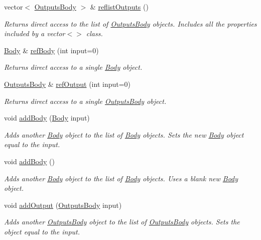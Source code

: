 \begin{DoxyCompactItemize}
vector$<$ \hyperlink{class_outputs_body}{Outputs\-Body} $>$ \& \hyperlink{class_system_aea22bb014c1b994c336842076cc86483}{reflist\-Outputs} ()
\begin{DoxyCompactList}\small\item\em Returns direct access to the list of \hyperlink{class_outputs_body}{Outputs\-Body} objects. Includes all the properties included by a vector$<$$>$ class. \end{DoxyCompactList}\item 
\hyperlink{class_body}{Body} \& \hyperlink{class_system_a3bb2a6aaa71a7b4b58afc8d92a67e214}{ref\-Body} (int input=0)
\begin{DoxyCompactList}\small\item\em Returns direct access to a single \hyperlink{class_body}{Body} object. \end{DoxyCompactList}\item 
\hyperlink{class_outputs_body}{Outputs\-Body} \& \hyperlink{class_system_af5cdbac74348f475cc5a529134ac418d}{ref\-Output} (int input=0)
\begin{DoxyCompactList}\small\item\em Returns direct access to a single \hyperlink{class_outputs_body}{Outputs\-Body} object. \end{DoxyCompactList}\item 
void \hyperlink{class_system_a0e146c46e245b3222a77fbcf93901630}{add\-Body} (\hyperlink{class_body}{Body} input)
\begin{DoxyCompactList}\small\item\em Adds another \hyperlink{class_body}{Body} object to the list of \hyperlink{class_body}{Body} objects. Sets the new \hyperlink{class_body}{Body} object equal to the input. \end{DoxyCompactList}\item 
void \hyperlink{class_system_a31949bbe2fceb1df4ba99f9c9c9465cd}{add\-Body} ()
\begin{DoxyCompactList}\small\item\em Adds another \hyperlink{class_body}{Body} object to the list of \hyperlink{class_body}{Body} objects. Uses a blank new \hyperlink{class_body}{Body} object. \end{DoxyCompactList}\item 
void \hyperlink{class_system_a439bada214bf663084c15939a1793e02}{add\-Output} (\hyperlink{class_outputs_body}{Outputs\-Body} input)
\begin{DoxyCompactList}\small\item\em Adds another \hyperlink{class_outputs_body}{Outputs\-Body} object to the list of \hyperlink{class_outputs_body}{Outputs\-Body} objects. Sets the object equal to the input. \end{DoxyCompactList}\item 

\end{DoxyCompactItemize}
